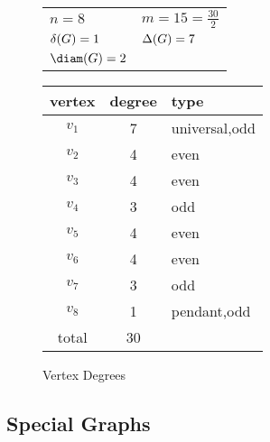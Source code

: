 \begin{figure}[h]
  \label{fig:degree}
  \begin{minipage}[t]{3in}
    \begin{center}
      \vspace{0pt}

      \bigskip

      \begin{tabular}{ll}
        \(n=8\) & \(m=15=\frac{30}{2}\) \\
        \(\delta(G)=1\) & \(\Delta(G)=7\) \\
        \(\diam(G)=2\)
      \end{tabular}
    \end{center}
  \end{minipage}
  \begin{minipage}[t]{3in}
    \vspace{0pt}
    \begin{tabular}{c|c|l}
      vertex & degree & type \\
      \hline
      \(v_1\) & 7 & universal,odd \\
      \(v_2\) & 4 & even \\
      \(v_3\) & 4 & even \\
      \(v_4\) & 3 & odd \\
      \(v_5\) & 4 & even \\
      \(v_6\) & 4 & even \\
      \(v_7\) & 3 & odd \\
      \(v_8\) & 1 & pendant,odd \\
      \hline
      total & 30 &
    \end{tabular}
  \end{minipage}
  \caption{Vertex Degrees}
\end{figure}

\subsection{Special Graphs}

